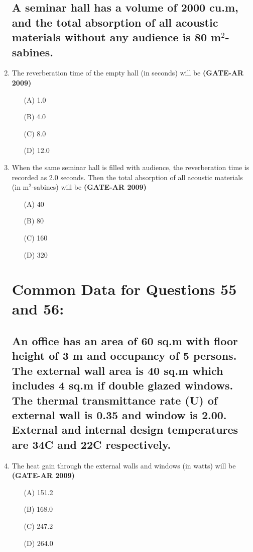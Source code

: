 \documentclass[a4paper,10pt]{article}
\begin{document}
\begin{enumerate}
\subsection*{A seminar hall has a volume of 2000 cu.m, and the total absorption of all acoustic materials without any audience is 80 m\(^2\)-sabines.}

    \item The reverberation time of the empty hall (in seconds) will be \hfill \textbf{(GATE-AR 2009)}
    \begin{multicols}{4}
	\begin{itemize}
        \item[(A)] 1.0
        \item[(B)] 4.0
        \item[(C)] 8.0
        \item[(D)] 12.0
    \end{itemize}
	\end{multicols}

    \item When the same seminar hall is filled with audience, the reverberation time is recorded as 2.0 seconds. Then the total absorption of all acoustic materials (in m\(^2\)-sabines) will be \hfill \textbf{(GATE-AR 2009)}
    \begin{multicols}{4}
	\begin{itemize}
        \item[(A)] 40
        \item[(B)] 80
        \item[(C)] 160
        \item[(D)] 320
    \end{itemize}
	\end{multicols}
	
\section*{Common Data for Questions 55 and 56:}
\subsection*{An office has an area of 60 sq.m with floor height of 3 m and occupancy of 5 persons. The external wall area is 40 sq.m which includes 4 sq.m if double glazed windows. The thermal transmittance rate (U) of external wall is 0.35 and window is 2.00. External and internal design temperatures are 34\textdegree C and 22\textdegree C respectively.}

    \item The heat gain through the external walls and windows (in watts) will be \hfill \textbf{(GATE-AR 2009)}
    \begin{multicols}{4}
	\begin{itemize}
        \item[(A)] 151.2
        \item[(B)] 168.0
        \item[(C)] 247.2
        \item[(D)] 264.0
    \end{itemize}
	\end{multicols}


\end{enumerate}
\end{document}
